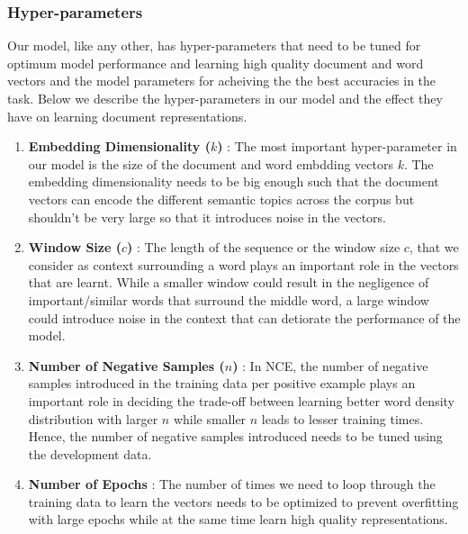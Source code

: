 \subsubsection{Hyper-parameters}
Our model, like any other, has hyper-parameters that need to be tuned for optimum model performance and learning high quality document and word vectors and the model parameters for acheiving the the best accuracies in the task. Below we describe the hyper-parameters in our model and the effect they have on learning document representations.
\begin{enumerate}
\item \textbf{Embedding Dimensionality ($k$)} : The most important hyper-parameter in our model is the size of the document and word embdding vectors $k$. The embedding dimensionality needs to be big enough such that the document vectors can encode the different semantic topics across the corpus but shouldn't be very large so that it introduces noise in the vectors.

\item \textbf{Window  Size ($c$)} : The length of the sequence or the window size $c$, that we consider as context surrounding a word plays an important role in the vectors that are learnt. While a smaller window could result in the negligence of important/similar words that surround the middle word, a large window could introduce noise in the context that can detiorate the performance of the model.

\item \textbf{Number of Negative Samples ($n$)} : In NCE, the number of negative samples introduced in the training data per positive example plays an important role in deciding the trade-off between learning better word density distribution with larger $n$ while smaller $n$ leads to lesser training times. Hence, the number of negative samples introduced needs to be tuned using the development data.

\item \textbf{Number of Epochs} : The number of times we need to loop through the training data to learn the vectors needs to be optimized to prevent overfitting with large epochs while at the same time learn high quality representations.
\end{enumerate}



